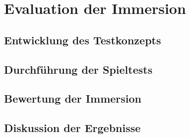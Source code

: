 \chapter{Evaluation der Immersion}

\section{Entwicklung des Testkonzepts}

\section{Durchführung der Spieltests}

\section{Bewertung der Immersion}

\section{Diskussion der Ergebnisse}